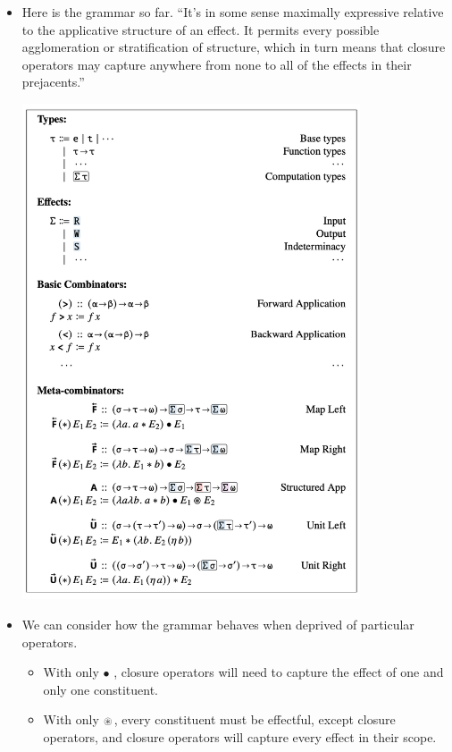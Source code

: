 \documentclass{article}
\begin{document}
\begin{itemize}
\begin{exe}
\begin{center}
      \end{center}
    \end{exe}
  \item Here is the grammar so far. ``It's in some sense maximally expressive relative to the applicative structure of an effect. It permits every possible agglomeration or stratification of structure, which in turn means that closure operators may capture anywhere from none to all of the effects in their prejacents.''
    \begin{center}
      \includegraphics[width=10cm]{clips/43.png}
    \end{center}

  \item We can consider how the grammar behaves when deprived of particular operators.
    \begin{itemize}
      \item With only $\bullet$ , closure operators will need to capture the effect of one and only one constituent.
      \item With only $\oast$, every constituent must be effectful, except closure operators, and closure operators will capture every effect in their scope.
    \end{itemize}
\end{itemize}
\end{document}
